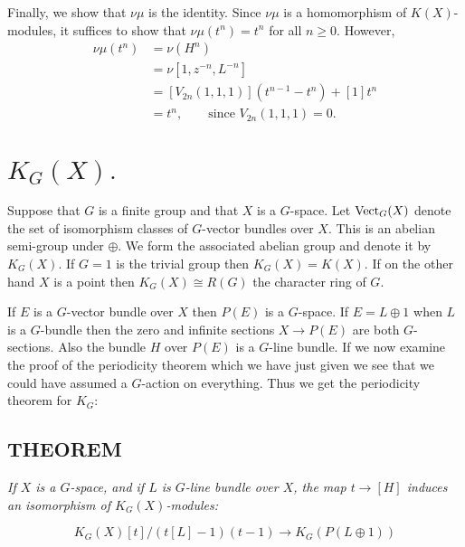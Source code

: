 Finally, we show that $\nu\mu$ is the identity. Since $\nu\mu$ is a homomorphism of $K(X)$-modules, it suffices to show that $\nu\mu(t^n) = t^n$ for all $n \geq 0$. However,
\begin{align*}
    \nu\mu(t^n) &= \nu(H^n) \\
    &= \nu[1, z^{-n}, L^{-n}] \\
    &= [V_{2n}(1, 1, 1)](t^{n-1} - t^n) + [1]t^n \\
    &= t^n, \qquad \text{since } V_{2n}(1, 1, 1) = 0 .
\end{align*}

\newpage


\section{$K_G(X).$} Suppose that $G$ is a finite group and that $X$ is a $G$-space. Let $\operatorname{Vect}_G(X)$ denote the set of isomorphism classes of $G$-vector bundles over $X$. This is an abelian semi-group under $\oplus$. We form the associated abelian group and denote it by $K_G(X)$. If $G = 1$ is the trivial group then $K_G(X) = K(X)$. If on the other hand $X$ is a point then $K_G(X) \cong R(G)$ the character ring of $G$. \par 

If $E$ is a $G$-vector bundle over $X$ then $P(E)$ is a $G$-space. If $E = L \oplus 1$ when $L$ is a $G$-bundle then the zero and infinite sections $X \to P(E)$ are both $G$-sections. Also the bundle $H$ over $P(E)$ is a $G$-line bundle. If we now examine the proof of the periodicity theorem which we have just given we see that we could have assumed a $G$-action on everything. Thus we get the periodicity theorem for $K_G$: \par 

\subsection{THEOREM}\label{the:2.3.1} \textit{If $X$ is a $G$-space, and if $L$ is $G$-line bundle over $X$, the map $t \to [H]$ induces an isomorphism of $K_G(X)$-modules:}

\begin{equation*}
    K_G(X)[t]/(t[L]-1)(t-1) \to K_G(P(L \oplus 1))
\end{equation*}
